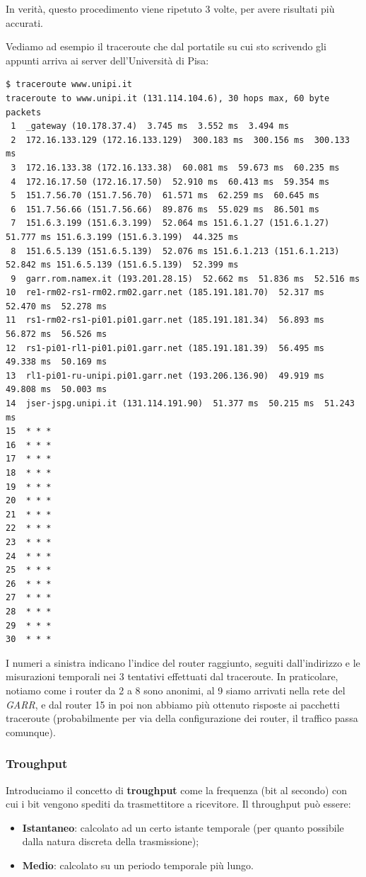 \documentclass[a4paper,11pt]{article}
\begin{document}
In verità, questo procedimento viene ripetuto 3 volte, per avere risultati più accurati.

Vediamo ad esempio il traceroute che dal portatile su cui sto scrivendo gli appunti arriva ai server dell'Università di Pisa:
\begin{lstlisting}[style=shellstyle]
$ traceroute www.unipi.it
traceroute to www.unipi.it (131.114.104.6), 30 hops max, 60 byte packets
 1  _gateway (10.178.37.4)  3.745 ms  3.552 ms  3.494 ms
 2  172.16.133.129 (172.16.133.129)  300.183 ms  300.156 ms  300.133 ms
 3  172.16.133.38 (172.16.133.38)  60.081 ms  59.673 ms  60.235 ms
 4  172.16.17.50 (172.16.17.50)  52.910 ms  60.413 ms  59.354 ms
 5  151.7.56.70 (151.7.56.70)  61.571 ms  62.259 ms  60.645 ms
 6  151.7.56.66 (151.7.56.66)  89.876 ms  55.029 ms  86.501 ms
 7  151.6.3.199 (151.6.3.199)  52.064 ms 151.6.1.27 (151.6.1.27)  51.777 ms 151.6.3.199 (151.6.3.199)  44.325 ms
 8  151.6.5.139 (151.6.5.139)  52.076 ms 151.6.1.213 (151.6.1.213)  52.842 ms 151.6.5.139 (151.6.5.139)  52.399 ms
 9  garr.rom.namex.it (193.201.28.15)  52.662 ms  51.836 ms  52.516 ms
10  re1-rm02-rs1-rm02.rm02.garr.net (185.191.181.70)  52.317 ms  52.470 ms  52.278 ms
11  rs1-rm02-rs1-pi01.pi01.garr.net (185.191.181.34)  56.893 ms  56.872 ms  56.526 ms
12  rs1-pi01-rl1-pi01.pi01.garr.net (185.191.181.39)  56.495 ms  49.338 ms  50.169 ms
13  rl1-pi01-ru-unipi.pi01.garr.net (193.206.136.90)  49.919 ms  49.808 ms  50.003 ms
14  jser-jspg.unipi.it (131.114.191.90)  51.377 ms  50.215 ms  51.243 ms
15  * * *
16  * * *
17  * * *
18  * * *
19  * * *
20  * * *
21  * * *
22  * * *
23  * * *
24  * * *
25  * * *
26  * * *
27  * * *
28  * * *
29  * * *
30  * * *
\end{lstlisting}
I numeri a sinistra indicano l'indice del router raggiunto, seguiti dall'indirizzo e le misurazioni temporali nei 3 tentativi effettuati dal traceroute.
In praticolare, notiamo come i router da 2 a 8 sono anonimi, al 9 siamo arrivati nella rete del \textit{GARR}, e dal router 15 in poi non abbiamo più ottenuto risposte ai pacchetti traceroute (probabilmente per via della configurazione dei router, il traffico passa comunque).

\subsubsection{Troughput}
Introduciamo il concetto di \textbf{troughput} come la frequenza (bit al secondo) con cui i bit vengono spediti da trasmettitore a ricevitore.
Il throughput può essere:
\begin{itemize}
	\item \textbf{Istantaneo}: calcolato ad un certo istante temporale (per quanto possibile dalla natura discreta della trasmissione);
	\item \textbf{Medio}: calcolato su un periodo temporale più lungo.
\end{itemize}
\end{document}
